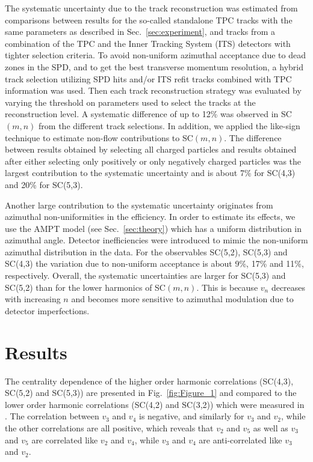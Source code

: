 The systematic uncertainty due to the track reconstruction was estimated from comparisons between results for the so-called standalone TPC tracks with the 
same parameters as described in Sec.~\ref{sec:experiment}, and tracks from a combination of the TPC and the Inner Tracking System (ITS) detectors with tighter selection criteria.
To avoid non-uniform azimuthal acceptance due to dead zones in the SPD, and to get the best transverse momentum resolution, a hybrid track selection utilizing SPD hits and/or ITS refit tracks combined with TPC information was used.
Then each track reconstruction strategy was evaluated by varying the threshold on parameters used to select the tracks at the reconstruction level. 
A systematic difference of up to 12\% was observed in SC$(m,n)$ from the different track selections. 
In addition, we applied the like-sign technique to estimate non-flow contributions to SC$(m,n)$. The difference between results obtained by selecting all charged particles and results obtained after either selecting only positively or only negatively charged particles was the largest contribution to the systematic uncertainty and is about 7\% for SC(4,3) and 20\% for SC(5,3). 

Another large contribution to the systematic uncertainty originates from azimuthal non-uniformities in the efficiency. In order to estimate its effects, we use the AMPT model (see Sec.~\ref{sec:theory}) which has a uniform distribution in azimuthal angle.
Detector inefficiencies were introduced to mimic the non-uniform azimuthal distribution in the data. For the observables SC(5,2), SC(5,3) and SC(4,3) the variation due to non-uniform acceptance is about 9\%, 17\% and 11\%, respectively.
Overall, the systematic uncertainties are larger for SC(5,3) and SC(5,2) than for the lower harmonics of SC$(m,n)$.
This is because $v_{n}$ decreases with increasing $n$ and becomes more sensitive to azimuthal modulation due to detector imperfections. 

\section{Results}
\label{sec:results}

The centrality dependence of the higher order harmonic correlations (SC(4,3), SC(5,2) and SC(5,3)) are presented in Fig.~\ref{fig:Figure_1} and compared to the lower order harmonic correlations (SC(4,2) and SC(3,2)) which were measured in \cite{ALICE:2016kpq}. The correlation between $v_3$ and $v_4$ is negative, and similarly for $v_3$ and $v_2$, while the other correlations are all positive, which reveals that $v_2$ and $v_5$ as well as $v_3$ and $v_5$ are correlated like $v_2$ and $v_4$, while $v_3$ and $v_4$ are anti-correlated like $v_3$ and $v_2$.

